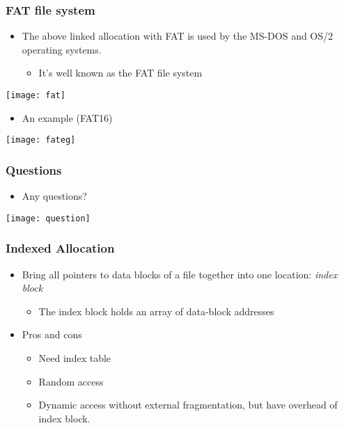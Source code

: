 \documentclass[CJKutf8,xcolor=pdftex,dvipsnames,table]{beamer}
\begin{document}
\begin{CJK*}{UTF8}{song}
  \begin{frame}
    \frametitle{FAT file system} \pause
    \begin{itemize}\parskip=0pt
    \item The above linked allocation with FAT is used by the MS-DOS and OS/2 operating systems. \pause
      \begin{itemize}\parskip=0pt
      \item It's well known as the FAT file system \pause
      \end{itemize}
    \end{itemize}
    \begin{center}
      \texttt{[image: fat]} \pause
    \end{center}
    \begin{itemize}\parskip=0pt
    \item An example (FAT16) \pause
    \end{itemize}
    \begin{center}
      \texttt{[image: fateg]}
    \end{center}
  \end{frame}
  
  \begin{frame}
    \frametitle{Questions}
    \begin{itemize}
    \item Any questions?
    \end{itemize}
    \begin{center}
      \texttt{[image: question]}
    \end{center}
  \end{frame}
  
  \begin{frame}
    \frametitle{Indexed Allocation} \pause
    \begin{itemize}\parskip=0pt
    \item Bring all pointers to data blocks of a file together into one location: \emph{index block} \pause
      \begin{itemize}\parskip=0pt
      \item The index block holds an array of data-block addresses \pause
      \end{itemize}
    \item Pros and cons \pause
      \begin{itemize}\parskip=0pt
      \item Need index table \pause
      \item Random access \pause
      \item Dynamic access without external fragmentation, but have overhead of index block.
      \end{itemize}
    \end{itemize}
  \end{frame}
  

\end{CJK*}
\end{document}
